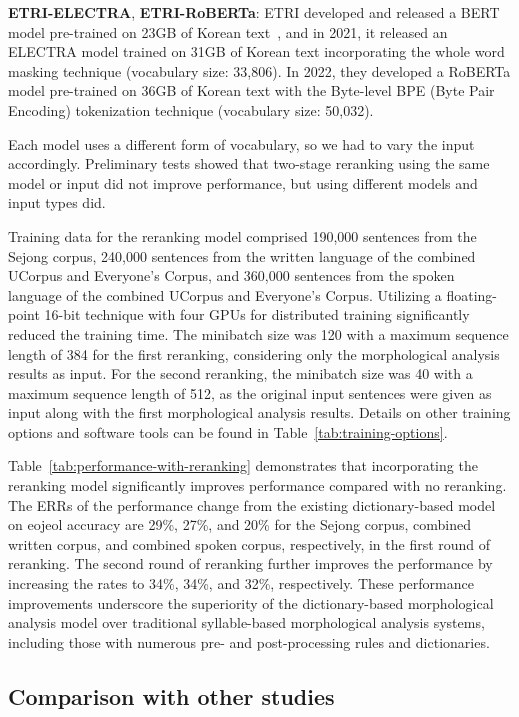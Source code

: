 \documentclass[AMS,STIX2COL]{WileyNJD-v2}
\begin{document}
    \textbf{ETRI-ELECTRA}, \textbf{ETRI-RoBERTa}: ETRI developed and released a BERT model pre-trained on 23GB of Korean text~\cite{KorBERT}, and in 2021, it released an ELECTRA model trained on 31GB of Korean text incorporating the whole word masking technique (vocabulary size: 33,806).
    In 2022, they developed a RoBERTa model pre-trained on 36GB of Korean text with the Byte-level BPE (Byte Pair Encoding) tokenization technique (vocabulary size: 50,032).

    Each model uses a different form of vocabulary, so we had to vary the input accordingly.
    Preliminary tests showed that two-stage reranking using the same model or input did not improve performance, but using different models and input types did.

    Training data for the reranking model comprised 190,000 sentences from the Sejong corpus, 240,000 sentences from the written language of the combined UCorpus and Everyone's Corpus, and 360,000 sentences from the spoken language of the combined UCorpus and Everyone's Corpus.
    Utilizing a floating-point 16-bit technique with four GPUs for distributed training significantly reduced the training time.
    The minibatch size was 120 with a maximum sequence length of 384 for the first reranking, considering only the morphological analysis results as input.
    For the second reranking, the minibatch size was 40 with a maximum sequence length of 512, as the original input sentences were given as input along with the first morphological analysis results.
    Details on other training options and software tools can be found in Table~\ref{tab:training-options}.

    Table~\ref{tab:performance-with-reranking} demonstrates that incorporating the reranking model significantly improves performance compared with no reranking.
    The ERRs of the performance change from the existing dictionary-based model on eojeol accuracy are 29\%, 27\%, and 20\% for the Sejong corpus, combined written corpus, and combined spoken corpus, respectively, in the first round of reranking.
    The second round of reranking further improves the performance by increasing the rates to 34\%, 34\%, and 32\%, respectively.
    These performance improvements underscore the superiority of the dictionary-based morphological analysis model over traditional syllable-based morphological analysis systems, including those with numerous pre- and post-processing rules and dictionaries.

    \subsection{Comparison with other studies}\label{subsec:comparison-to-other-studies}
\end{document}
